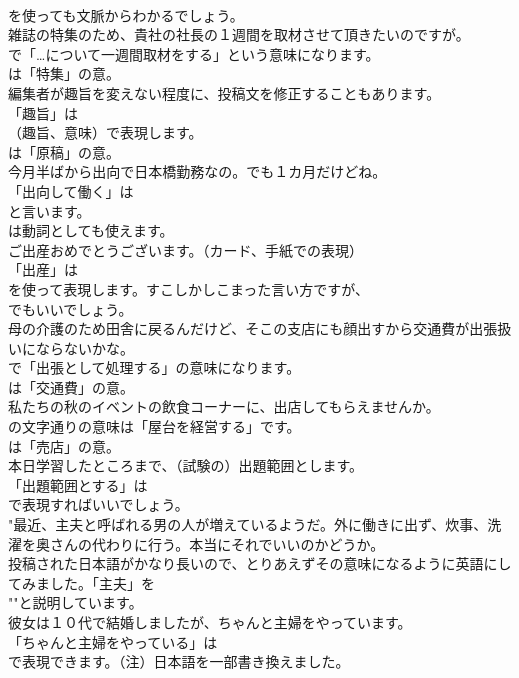 \documentclass[8pt]{extreport}
\begin{document}
\begin{CJK}{UTF8}{min}
\\	を使っても文脈からわかるでしょう。	
\\	雑誌の特集のため、貴社の社長の１週間を取材させて頂きたいのですが。 
\\	で「…について一週間取材をする」という意味になります。
\\	は「特集」の意。	
\\	編集者が趣旨を変えない程度に、投稿文を修正することもあります。 
\\	「趣旨」は 
\\	（趣旨、意味）で表現します。
\\	は「原稿」の意。	
\\	今月半ばから出向で日本橋勤務なの。でも１カ月だけどね。 
\\	「出向して働く」は
\\	と言います。
\\	は動詞としても使えます。	
\\	ご出産おめでとうございます。（カード、手紙での表現） 
\\	「出産」は
\\	を使って表現します。すこしかしこまった言い方ですが、
\\	でもいいでしょう。	
\\	母の介護のため田舎に戻るんだけど、そこの支店にも顔出すから交通費が出張扱いにならないかな。 
\\	で「出張として処理する」の意味になります。
\\	は「交通費」の意。	
\\	私たちの秋のイベントの飲食コーナーに、出店してもらえませんか。 
\\	の文字通りの意味は「屋台を経営する」です。
\\	は「売店」の意。	
\\	本日学習したところまで、（試験の）出題範囲とします。 
\\	「出題範囲とする」は 
\\	で表現すればいいでしょう。	
\\	"最近、主夫と呼ばれる男の人が増えているようだ。外に働きに出ず、炊事、洗濯を奥さんの代わりに行う。本当にそれでいいのかどうか。 
\\	投稿された日本語がかなり長いので、とりあえずその意味になるように英語にしてみました。「主夫」を
\\	""と説明しています。
\\	彼女は１０代で結婚しましたが、ちゃんと主婦をやっています。 
\\	「ちゃんと主婦をやっている」は
\\	で表現できます。（注）日本語を一部書き換えました。	

\end{CJK}
\end{document}
